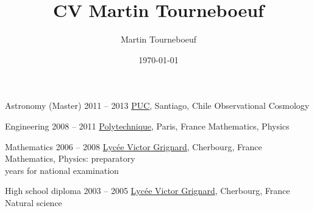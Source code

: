 \def\tbflanguage{english}

\ifx\HCode\undefined
  \providecommand\tbfbordertop{1.2}
  \providecommand\tbfborderleft{0.7}
  \providecommand\tbfwidth{12.4}
\else
  \providecommand\tbfbordertop{1}
  \providecommand\tbfborderleft{0.7}
  \providecommand\tbfwidth{12.4}
\fi

\ifx\HCode\undefined

%
\else

%
\fi

\title{CV Martin Tourneboeuf}
\author{Martin Tourneboeuf}
\date{\today}









\begin{coordinatelist}
\end{coordinatelist}



\pgfmathsetmacro{\tbfyeary}{\tbfbordertop+3.1}

\begin{yearlist}[7.7][\tbfborderleft][\tbfyeary]


\item[Astronomy (Master)]{2011 -- 2013}
  {
  \href{http://www.uc.cl/}{PUC}, Santiago, Chile
  }
  {   Observational Cosmology}


\item[Engineering]{2008 -- 2011}
  {
  \tbfix
  \href{https://www.polytechnique.edu/}{Polytechnique}, Paris, France
  }
  {    Mathematics, Physics}


\item[Mathematics]{2006 -- 2008}
  {
  \href{http://www.lycee-grignard.fr/}{Lyc\'ee Victor Grignard}, Cherbourg, France
  }
  {    Mathematics, Physics: preparatory \\ years for national examination}


\item[High school diploma]{2003 -- 2005}
  {
  \href{http://www.lycee-grignard.fr/}{Lyc\'ee Victor Grignard}, Cherbourg, France
  }
  {    Natural science}

\end{yearlist}




